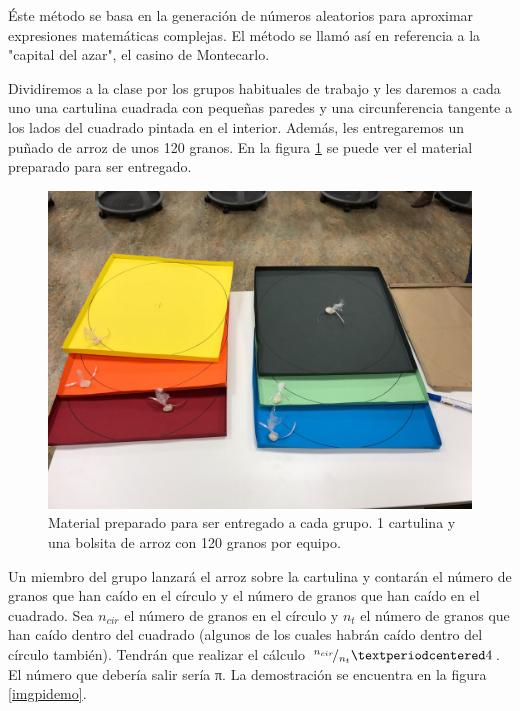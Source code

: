 Éste método se basa en la generación de números aleatorios para aproximar expresiones matemáticas complejas. 
%
El método se llamó así en referencia a la "capital del azar", el casino de Montecarlo.


Dividiremos a la clase por los grupos habituales de trabajo y les daremos a cada uno una cartulina cuadrada con pequeñas paredes y una circunferencia tangente a los lados del cuadrado pintada en el interior. Además, les entregaremos un puñado de arroz de unos 120 granos.
%
En la figura \ref{imgcartulinas} se puede ver el material preparado para ser entregado.

\begin{figure}[hbtp]
\centering
\includegraphics[scale=0.25]{img/cartulinas.jpeg}
\caption{Material preparado para ser entregado a cada grupo. 1 cartulina y una bolsita de arroz con 120 granos por equipo.}
\label{imgcartulinas}
\end{figure}

Un miembro del grupo lanzará el arroz sobre la cartulina y contarán el número de granos que han caído en el círculo y el número de granos que han caído en el cuadrado.
%
Sea $n_{cir}$ el número de granos en el círculo y $n_t$ el número de granos que han caído dentro del cuadrado (algunos de los cuales habrán caído dentro del círculo también).
%
Tendrán que realizar el cálculo $\rfrac{n_{cir}}{n_t}·4$.
%
El número que debería salir sería π. La demostración se encuentra en la figura \ref{imgpidemo}.

